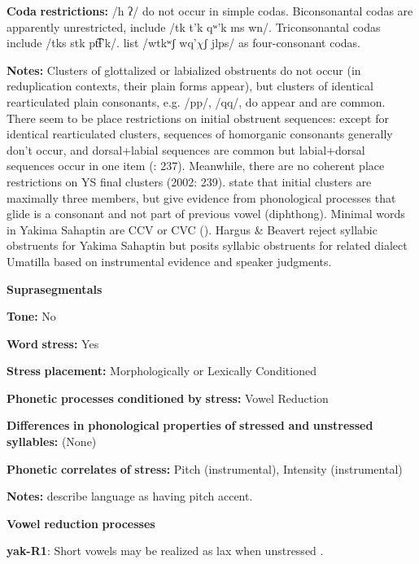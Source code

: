\textbf{Coda} \textbf{restrictions:} /h ʔ/ do not occur in simple codas. Biconsonantal codas are apparently unrestricted, include /tk t’k qʷ'k ms wn/. Triconsonantal codas include /tks stk pt͡ɬ’k/. \citet{HargusBeavert2006} list /wtkʷʃ wq’$\chi ʃ$ jlps/ as four-consonant codas.

\textbf{Notes:} Clusters of glottalized or labialized obstruents do not occur (in reduplication contexts, their plain forms appear), but clusters of identical rearticulated plain consonants, e.g. /pp/, /qq/, do appear and are common. There seem to be place restrictions on initial obstruent sequences: except for identical rearticulated clusters, sequences of homorganic consonants generally don’t occur, and dorsal+labial sequences are common but labial+dorsal sequences occur in one item (\citealt{HargusBeavert2002}: 237). Meanwhile, there are no coherent place restrictions on YS final clusters (2002: 239). \citet{RigsbyRude1996} state that initial clusters are maximally three members, but \citet{HargusBeavert2006} give evidence from phonological processes that glide is a consonant and not part of previous vowel (diphthong). Minimal words in Yakima Sahaptin are CCV or CVC (\citealt{HargusBeavert2006}). Hargus \& Beavert reject syllabic obstruents for Yakima Sahaptin but \citet{Minthorn2005} posits syllabic obstruents for related dialect Umatilla based on instrumental evidence and speaker judgments.

\textbf{Suprasegmentals}

\textbf{Tone:} No

\textbf{Word} \textbf{stress:} Yes

\textbf{Stress} \textbf{placement:} Morphologically or Lexically Conditioned

\textbf{Phonetic} \textbf{processes} \textbf{conditioned} \textbf{by} \textbf{stress:} Vowel Reduction

\textbf{Differences} \textbf{in} \textbf{phonological} \textbf{properties} \textbf{of} \textbf{stressed} \textbf{and} \textbf{unstressed} \textbf{syllables:} (None)

\textbf{Phonetic} \textbf{correlates} \textbf{of} \textbf{stress:} Pitch (instrumental), Intensity (instrumental)

\textbf{Notes:} \citet{HargusBeavert2005} describe language as having pitch accent.

\textbf{Vowel} \textbf{reduction} \textbf{processes}

\textbf{yak-R1}: Short vowels may be realized as lax when unstressed \citep[40]{Jansen2010}.

